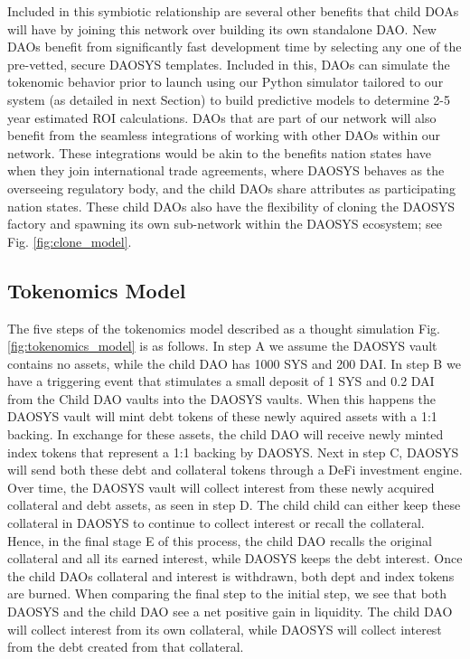\documentclass[journal,twocolumn,12pt]{ieeesyscoin}
\begin{document}
Included in this symbiotic relationship are several other benefits that child DOAs will have by joining this network over building its own standalone DAO. New DAOs benefit from significantly fast development time by selecting any one of the pre-vetted, secure DAOSYS templates. Included in this, DAOs can simulate the tokenomic behavior prior to launch using our Python simulator tailored to our system (as detailed in next Section) to build predictive models to determine 2-5 year estimated ROI calculations. DAOs that are part of our network will also benefit from the seamless integrations of working with other DAOs within our network. These integrations would be akin to the benefits nation states have when they join international trade agreements, where DAOSYS behaves as the overseeing regulatory body, and the child DAOs share attributes as participating nation states. These child DAOs also have the flexibility of cloning the DAOSYS factory and spawning its own sub-network within the DAOSYS ecosystem; see Fig. \ref{fig:clone_model}.  

\subsection{Tokenomics Model}
\label{sec:tokenomics_model}

The five steps of the tokenomics model described as a thought simulation Fig. \ref{fig:tokenomics_model} is as follows. In step A we assume the DAOSYS vault contains no assets, while the child DAO has 1000 SYS and 200 DAI. In step B we have a triggering event that stimulates a small deposit of 1 SYS and 0.2 DAI from the Child DAO vaults into the DAOSYS vaults. When this happens the DAOSYS vault will mint debt tokens of these newly aquired assets with a 1:1 backing. In exchange for these assets, the child DAO will receive newly minted index tokens that represent a 1:1 backing by DAOSYS. Next in step C, DAOSYS will send both these debt and collateral tokens through a DeFi investment engine. Over time, the DAOSYS vault will collect interest from these newly acquired collateral and debt assets, as seen in step D. The child child can either keep these collateral in DAOSYS to continue to collect interest or recall the collateral. Hence, in the final stage E of this process, the child DAO recalls the original collateral and all its earned interest, while DAOSYS keeps the debt interest. Once the child DAOs collateral and interest is withdrawn, both dept and index tokens are burned. When comparing the final step to the initial step, we see that both DAOSYS and the child DAO see a net positive gain in liquidity. The child DAO will collect interest from its own collateral, while DAOSYS will collect interest from the debt created from that collateral. 
\end{document}

